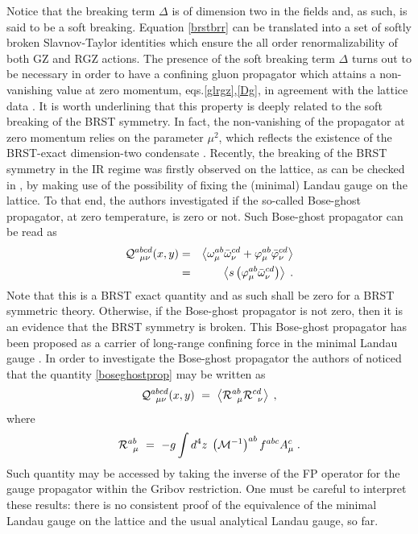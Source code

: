 Notice that the breaking term $\Delta$ is of dimension two in the fields and, as such, is said
to be a soft breaking. 
Equation \eqref{brstbrr} can be translated into a
set of softly broken Slavnov-Taylor  identities which ensure the all order renormalizability of
both GZ and RGZ actions. The presence of the soft breaking term $\Delta$ turns out to be
necessary in order to have a confining gluon propagator which attains a non-vanishing value at
zero momentum, eqs.\eqref{glrgz},\eqref{Dg}, in agreement with the lattice data
\cite{Cucchieri:2007rg,Cucchieri:2008fc,Cucchieri:2011ig}. It is worth underlining that this
property is deeply related to the soft breaking of the BRST symmetry. In fact, the
non-vanishing of the propagator at zero momentum relies on  the parameter $\mu^2$, which
reflects the existence of the   BRST-exact dimension-two condensate
\cite{Dudal:2007cw,Dudal:2008sp,Dudal:2011gd,Dudal:2008rm}.
Recently, the breaking of the BRST symmetry in the IR regime was firstly observed on the
lattice, as can be checked in \cite{Cucchieri:2014via}, by making use of the possibility of
fixing the (minimal) Landau gauge on the lattice. To that end, the authors investigated if the
so-called Bose-ghost propagator, at zero temperature, is zero or not. Such Bose-ghost
propagator can be read as
\begin{eqnarray}
{\cal Q}^{abcd}_{\;\;\mu\nu}(x,y) &=& \left\langle \omega^{ab}_{\mu}\bar{\omega}^{cd}_{\nu} +
\varphi^{ab}_{\mu} \bar{\varphi}^{cd}_{\nu}  \right\rangle 
\nonumber \\
&=&
\left\langle s \left( \varphi^{ab}_{\mu} \bar{\omega}^{cd}_{\nu} \right)  \right\rangle 
\;.
\label{boseghostprop}
\end{eqnarray}
Note that this is a BRST exact quantity and as
such shall be zero for a BRST symmetric theory. Otherwise, if the Bose-ghost propagator is not
zero, then it is an evidence that the BRST symmetry is broken. This Bose-ghost propagator has
been proposed as a carrier of long-range confining force in the minimal Landau gauge
\cite{Zwanziger:2009je}. In order to investigate the Bose-ghost propagator the authors of
\cite{Cucchieri:2014via} noticed that the quantity \eqref{boseghostprop} may be written as
\begin{eqnarray}
{\cal Q}^{abcd}_{\;\;\mu\nu}(x,y) ~=~  \left\langle {\cal R}^{ab}_{\;\;\mu}
{\cal R}^{cd}_{\;\;\nu}
\right\rangle \;,
\end{eqnarray}
where
\begin{eqnarray}
{\cal R}^{ab}_{\;\;\mu} ~=~ -g\int d^{4}z\; \left( {\cal M}^{-1}
\right)^{ab}f^{abc}A^{c}_{\mu}\;.
\end{eqnarray}
Such quantity may be accessed by taking the inverse of the FP operator for the gauge propagator
within the Gribov restriction. One must be careful to interpret these results: there is no
consistent proof of the equivalence of the minimal Landau gauge on the lattice and the usual
analytical Landau gauge, so far.













